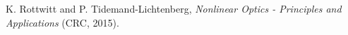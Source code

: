 \documentclass[10pt,letterpaper]{article}
\begin{document}
\begin{thebibliography}{99}
%
%

 K. Rottwitt and P. Tidemand-Lichtenberg, \textit{Nonlinear Optics - Principles and Applications} (CRC, 2015).


\end{thebibliography}

\end{document}
